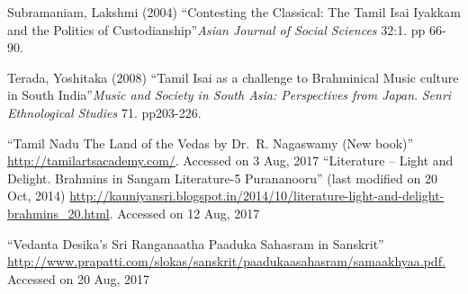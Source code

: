 \begin{thebibliography}{99}
  Subramaniam, Lakshmi (2004) “Contesting the Classical: The Tamil Isai Iyakkam and the Politics of Custodianship”\textit{Asian Journal of Social Sciences} 32:1. pp 66-90.

  Terada, Yoshitaka (2008) “Tamil Isai as a challenge to Brahminical Music culture in South India”\textit{Music and Society in South Asia: Perspectives from Japan}. \textit{Senri Ethnological Studies }71. pp203-226.

  “Tamil Nadu The Land of the Vedas by Dr.\ R. Nagaswamy (New book)” \url{http://tamilartsacademy.com/}. Accessed on 3 Aug, 2017 “Literature – Light and Delight. Brahmins in Sangam Literature-5 Purananooru” (last modified on 20 Oct, 2014) \url{http://kauniyansri.blogspot.in/2014/10/literature-light-and-delight-brahmins_20.html}. Accessed on 12 Aug, 2017

  “Vedanta Desika’s Sri Ranganaatha Paaduka Sahasram in Sanskrit” \url{http://www.prapatti.com/slokas/sanskrit/paadukaasahasram/samaakhyaa.pdf.} Accessed on 20 Aug, 2017

 \end{thebibliography}

\theendnotes

